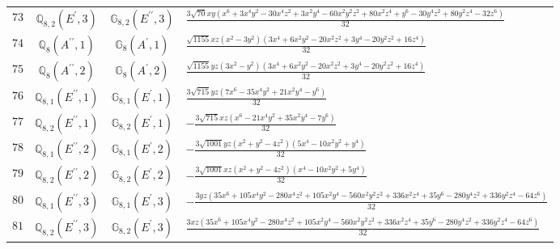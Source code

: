 \documentclass[fleqn,8pt,landscape]{jsarticle}
\begin{document}
\begin{table}[ht!]
\begin{center}
\begin{tabular}{cccl}
$ 73 $ & $ \mathbb{Q}_{8,2}(E^{\prime},3) $ & $ \mathbb{G}_{8,2}(E^{\prime\prime},3) $ & $ \frac{3 \sqrt{70} x y \left(x^{6} + 3 x^{4} y^{2} - 30 x^{4} z^{2} + 3 x^{2} y^{4} - 60 x^{2} y^{2} z^{2} + 80 x^{2} z^{4} + y^{6} - 30 y^{4} z^{2} + 80 y^{2} z^{4} - 32 z^{6}\right)}{32} $ \\
$ 74 $ & $ \mathbb{Q}_{8}(A^{\prime\prime},1) $ & $ \mathbb{G}_{8}(A^{\prime},1) $ & $ \frac{\sqrt{1155} x z \left(x^{2} - 3 y^{2}\right) \left(3 x^{4} + 6 x^{2} y^{2} - 20 x^{2} z^{2} + 3 y^{4} - 20 y^{2} z^{2} + 16 z^{4}\right)}{32} $ \\
$ 75 $ & $ \mathbb{Q}_{8}(A^{\prime\prime},2) $ & $ \mathbb{G}_{8}(A^{\prime},2) $ & $ \frac{\sqrt{1155} y z \left(3 x^{2} - y^{2}\right) \left(3 x^{4} + 6 x^{2} y^{2} - 20 x^{2} z^{2} + 3 y^{4} - 20 y^{2} z^{2} + 16 z^{4}\right)}{32} $ \\
$ 76 $ & $ \mathbb{Q}_{8,1}(E^{\prime\prime},1) $ & $ \mathbb{G}_{8,1}(E^{\prime},1) $ & $ \frac{3 \sqrt{715} y z \left(7 x^{6} - 35 x^{4} y^{2} + 21 x^{2} y^{4} - y^{6}\right)}{32} $ \\
$ 77 $ & $ \mathbb{Q}_{8,2}(E^{\prime\prime},1) $ & $ \mathbb{G}_{8,2}(E^{\prime},1) $ & $ - \frac{3 \sqrt{715} x z \left(x^{6} - 21 x^{4} y^{2} + 35 x^{2} y^{4} - 7 y^{6}\right)}{32} $ \\
$ 78 $ & $ \mathbb{Q}_{8,1}(E^{\prime\prime},2) $ & $ \mathbb{G}_{8,1}(E^{\prime},2) $ & $ - \frac{3 \sqrt{1001} y z \left(x^{2} + y^{2} - 4 z^{2}\right) \left(5 x^{4} - 10 x^{2} y^{2} + y^{4}\right)}{32} $ \\
$ 79 $ & $ \mathbb{Q}_{8,2}(E^{\prime\prime},2) $ & $ \mathbb{G}_{8,2}(E^{\prime},2) $ & $ - \frac{3 \sqrt{1001} x z \left(x^{2} + y^{2} - 4 z^{2}\right) \left(x^{4} - 10 x^{2} y^{2} + 5 y^{4}\right)}{32} $ \\
$ 80 $ & $ \mathbb{Q}_{8,1}(E^{\prime\prime},3) $ & $ \mathbb{G}_{8,1}(E^{\prime},3) $ & $ - \frac{3 y z \left(35 x^{6} + 105 x^{4} y^{2} - 280 x^{4} z^{2} + 105 x^{2} y^{4} - 560 x^{2} y^{2} z^{2} + 336 x^{2} z^{4} + 35 y^{6} - 280 y^{4} z^{2} + 336 y^{2} z^{4} - 64 z^{6}\right)}{32} $ \\
$ 81 $ & $ \mathbb{Q}_{8,2}(E^{\prime\prime},3) $ & $ \mathbb{G}_{8,2}(E^{\prime},3) $ & $ \frac{3 x z \left(35 x^{6} + 105 x^{4} y^{2} - 280 x^{4} z^{2} + 105 x^{2} y^{4} - 560 x^{2} y^{2} z^{2} + 336 x^{2} z^{4} + 35 y^{6} - 280 y^{4} z^{2} + 336 y^{2} z^{4} - 64 z^{6}\right)}{32} $ \\
 \hline \hline
\end{tabular}
\end{center}
\end{table}
\end{document}
